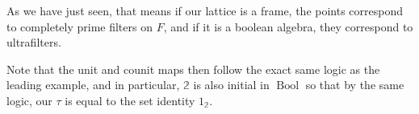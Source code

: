 \documentclass[12pt,a4paper]{article}
\newtheorem{lemma}{Lemma}[section] %
\DeclareMathOperator{\Bool}{Bool}
\begin{document}
As we have just seen, that means if our lattice is a frame, the points correspond to completely prime filters on $F$, and if it is a boolean algebra, they correspond to ultrafilters. 

Note that the unit and counit maps then follow the exact same logic as the leading example, and in particular, $\mathbb{2}$ is also initial in $\Bool$ so that by the same logic, our $\tau$ is equal to the set identity $1_{\mathbb{2}}$. 

%	
%  
%  
\end{document}
